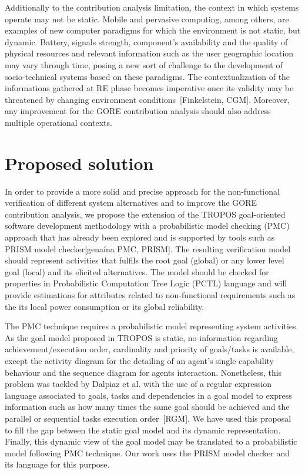 Additionally to the contribution analysis limitation, the context in which systems operate may not be static. Mobile and pervasive computing, among others, are examples of new computer paradigms for which the environment is not static, but dynamic. Battery, signals strength, component's availability and the quality of physical resources and relevant information such as the user geographic location may vary through time, posing a new sort of challenge to the development of socio-technical systems based on these paradigms. The contextualization of the informations gathered at RE phase becomes imperative once its validity may be threatened by changing environment conditions~[Finkelstein, CGM]. Moreover, any improvement for the GORE contribution analysis should also address multiple operational contexts.



\section{Proposed solution}

In order to provide a more solid and precise approach for the non-functional verification of different system alternatives and to improve the GORE contribution analysis, we propose the extension of the TROPOS goal-oriented software development methodology with a probabilistic model checking (PMC) approach that has already been explored and is supported by tools such as PRISM model checker[genaína PMC, PRISM]. The resulting verification model should represent activities that fulfils the root goal (global) or any lower level goal (local) and its elicited alternatives. The model should be checked for properties in Probabilistic Computation Tree Logic (PCTL) language and will provide estimations for attributes related to non-functional requirements such as the its local power consumption or its global reliability. 

The PMC technique requires a probabilistic model representing system activities. As the goal model proposed in TROPOS is static, no information regarding achievement/execution order, cardinality and priority of goals/tasks is available, except the activity diagram for the detailing of an agent's single capability behaviour and the sequence diagram for agents interaction. Nonetheless, this problem was tackled by Dalpiaz et al. with the use of a regular expression language associated to goals, tasks and dependencies in a goal model to express information such as how many times the same goal should be achieved and the parallel or sequential tasks execution order~[RGM]. We have used this proposal to fill the gap between the static goal model and its dynamic representation. Finally, this dynamic view of the goal model may be translated to a probabilistic model following PMC technique. Our work uses the PRISM model checker and its language for this purpose.

